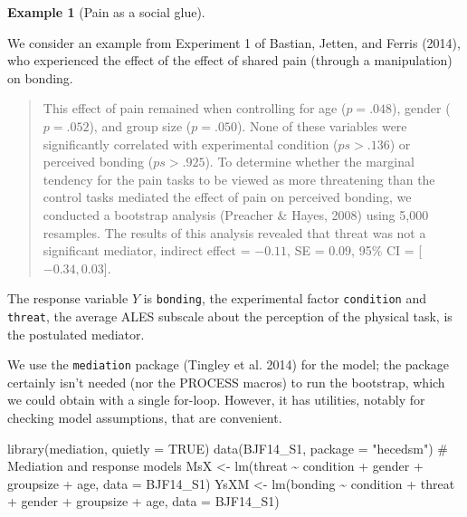 \documentclass[
  11pt,
  letterpaper,
]{scrbook}
\newenvironment{Shaded}{\begin{snugshade}}{\end{snugshade}}
\newcommand{\AttributeTok}[1]{\textcolor[rgb]{0.40,0.45,0.13}{#1}}
\newcommand{\CommentTok}[1]{\textcolor[rgb]{0.37,0.37,0.37}{#1}}
\newcommand{\ConstantTok}[1]{\textcolor[rgb]{0.56,0.35,0.01}{#1}}
\newcommand{\FunctionTok}[1]{\textcolor[rgb]{0.28,0.35,0.67}{#1}}
\newcommand{\NormalTok}[1]{\textcolor[rgb]{0.00,0.23,0.31}{#1}}
\newcommand{\OtherTok}[1]{\textcolor[rgb]{0.00,0.23,0.31}{#1}}
\newcommand{\SpecialCharTok}[1]{\textcolor[rgb]{0.37,0.37,0.37}{#1}}
\newcommand{\StringTok}[1]{\textcolor[rgb]{0.13,0.47,0.30}{#1}}
\theoremstyle{definition}
\theoremstyle{definition}
\newtheorem{example}{Example}[chapter]
\theoremstyle{remark}
\begin{document}
\begin{example}[Pain as a social
glue]\protect\hypertarget{exm-mediation1}{}\label{exm-mediation1}

We consider an example from Experiment 1 of Bastian, Jetten, and Ferris
(2014), who experienced the effect of the effect of shared pain (through
a manipulation) on bonding.

\begin{quote}
This effect of pain remained when controlling for age (\(p = .048\)),
gender (\(p = .052\)), and group size (\(p = .050\)). None of these
variables were significantly correlated with experimental condition
(\(ps > .136\)) or perceived bonding (\(ps > .925\)). To determine
whether the marginal tendency for the pain tasks to be viewed as more
threatening than the control tasks mediated the effect of pain on
perceived bonding, we conducted a bootstrap analysis (Preacher \& Hayes,
2008) using 5,000 resamples. The results of this analysis revealed that
threat was not a significant mediator, indirect effect = \(-0.11\), SE =
\(0.09\), 95\% CI = {[}\(-0.34, 0.03\){]}.
\end{quote}

The response variable \(Y\) is \texttt{bonding}, the experimental factor
\texttt{condition} and \texttt{threat}, the average ALES subscale about
the perception of the physical task, is the postulated mediator.

We use the \texttt{mediation} package (Tingley et al. 2014) for the
model; the package certainly isn't needed (nor the PROCESS macros) to
run the bootstrap, which we could obtain with a single for-loop.
However, it has utilities, notably for checking model assumptions, that
are convenient.

\begin{Shaded}
\begin{Highlighting}[]
\FunctionTok{library}\NormalTok{(mediation, }\AttributeTok{quietly =} \ConstantTok{TRUE}\NormalTok{)}
\FunctionTok{data}\NormalTok{(BJF14\_S1, }\AttributeTok{package =} \StringTok{"hecedsm"}\NormalTok{)}
\CommentTok{\# Mediation and response models}
\NormalTok{MsX }\OtherTok{\textless{}{-}} \FunctionTok{lm}\NormalTok{(threat }\SpecialCharTok{\textasciitilde{}}\NormalTok{ condition }\SpecialCharTok{+}\NormalTok{ gender }\SpecialCharTok{+}\NormalTok{ groupsize }\SpecialCharTok{+}\NormalTok{ age, }
          \AttributeTok{data =}\NormalTok{ BJF14\_S1)}
\NormalTok{YsXM }\OtherTok{\textless{}{-}} \FunctionTok{lm}\NormalTok{(bonding }\SpecialCharTok{\textasciitilde{}}\NormalTok{ condition }\SpecialCharTok{+}\NormalTok{ threat }\SpecialCharTok{+}\NormalTok{ gender }\SpecialCharTok{+}\NormalTok{ groupsize }\SpecialCharTok{+}\NormalTok{ age,}
           \AttributeTok{data =}\NormalTok{ BJF14\_S1)}
\end{Highlighting}
\end{Shaded}


\end{example}
\end{document}
